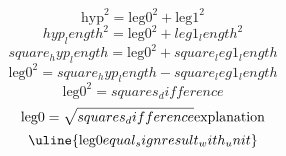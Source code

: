 \[\text{{{hyp}}}^{{2}}=\text{{{leg0}}}^{{2}}+\text{{{leg1}}}^{{2}}\]
\[{hyp_length}^{{2}}=\text{{{leg0}}}^{{2}}+{leg1_length}^{{2}}\]
\[{square_hyp_length}=\text{{{leg0}}}^{{2}}+{square_leg1_length}\]
\[\text{{{leg0}}}^{{2}}={square_hyp_length}-{square_leg1_length}\]
\[\text{{{leg0}}}^{{2}}={squares_difference}\]
\[\text{{{leg0}}}=\sqrt{{\mathstrut {squares_difference}}}\text{{{explanation}}}\]
\[\uline{{\text{{{leg0}}}{equal_sign}{result_with_unit}}}\]